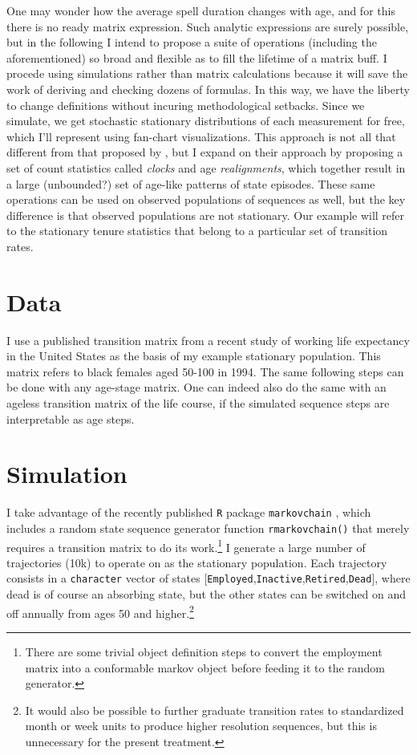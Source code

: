 \documentclass{article}
\begin{document}
One may wonder how the average spell duration changes with age, and for this
there is no ready matrix expression. Such analytic expressions are surely
possible, but in the following I intend to propose a suite of operations
(including the aforementioned) so broad and flexible as to fill the lifetime of
a matrix buff.
I procede using simulations rather than matrix calculations because it will
save the work of deriving and checking dozens of formulas. In this way, we have
the liberty to change definitions without incuring methodological setbacks.
Since we simulate, we get stochastic stationary distributions of each
measurement for free, which I'll represent using fan-chart visualizations. This
approach is not all that different from that proposed by \citet{laditka1998new},
but I expand on their approach by
proposing a set of count statistics called \emph{clocks} and age
\emph{realignments}, which together result in a large (unbounded?) set of
age-like patterns of state episodes. These same operations can be used
on observed populations of sequences as well, but the key difference
is that observed populations are not stationary. Our example will refer to the
stationary tenure statistics that belong to a particular set of transition
rates.

\section{Data}
I use a published transition matrix from a recent
study of working life expectancy in the United States \citep{Dudel2017} as the
basis of my example stationary population.
This matrix refers to black females aged 50-100 in 1994. The same following
steps can be done with any age-stage matrix. One can indeed also do the same with
an ageless transition matrix of the life course, if the simulated sequence steps
are interpretable as age steps.

\section{Simulation}
I take advantage of the recently published \texttt{R} package
\texttt{markovchain} \citep{spedicato2017}, which includes a random state
sequence generator function \texttt{rmarkovchain()} that merely requires a
transition matrix to do its work.\footnote{There are some trivial object
definition steps to convert the employment matrix into a conformable markov
object before feeding it to the random generator.} I generate a large number of
trajectories (10k) to operate on as the stationary population. Each
trajectory consists in a \texttt{character} vector of states
[\texttt{Employed},\texttt{Inactive},\texttt{Retired},\texttt{Dead}], where dead
is of course an absorbing state, but the other states can be switched on and off
annually from ages 50 and higher.\footnote{It would also be possible to further
graduate transition rates to standardized month or week units to produce higher
resolution sequences, but this is unnecessary for the present treatment.}
\end{document}
